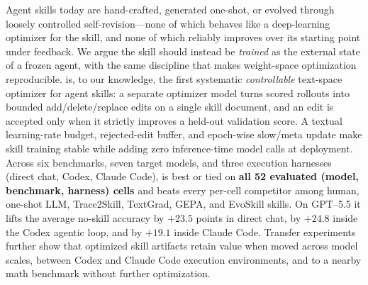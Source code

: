 Agent skills today are hand-crafted, generated one-shot, or evolved through loosely controlled self-revision---none of which behaves like a deep-learning optimizer for the skill, and none of which reliably improves over its starting point under feedback. We argue the skill should instead be \emph{trained} as the external state of a frozen agent, with the same discipline that makes weight-space optimization reproducible. \ourmethod{} is, to our knowledge, the first systematic \emph{controllable} text-space optimizer for agent skills: a separate optimizer model turns scored rollouts into bounded add/delete/replace edits on a single skill document, and an edit is accepted only when it strictly improves a held-out validation score. A textual learning-rate budget, rejected-edit buffer, and epoch-wise slow/meta update make skill training stable while adding zero inference-time model calls at deployment. Across six benchmarks, seven target models, and three execution harnesses (direct chat, Codex, Claude Code), \ourmethod{} is best or tied on \textbf{all 52 evaluated (model, benchmark, harness) cells} and beats every per-cell competitor among human, one-shot LLM, Trace2Skill, TextGrad, GEPA, and EvoSkill skills. On GPT--5.5 it lifts the average no-skill accuracy by $\mathbf{+23.5}$ points in direct chat, by $+24.8$ inside the Codex agentic loop, and by $+19.1$ inside Claude Code. Transfer experiments further show that optimized skill artifacts retain value when moved across model scales, between Codex and Claude Code execution environments, and to a nearby math benchmark without further optimization.

